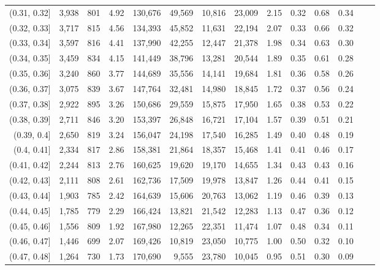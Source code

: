 \begin{tabular}{rrrrrrrrrrrrrr}
(0.31, 0.32]   &  3,938 &  801 &    4.92 &  130,676 &   49,569 &  10,816 &  23,009 &  2.15 &  0.32 &  0.68 &      0.34 \\
(0.32, 0.33]   &  3,717 &  815 &    4.56 &  134,393 &   45,852 &  11,631 &  22,194 &  2.07 &  0.33 &  0.66 &      0.32 \\
(0.33, 0.34]   &  3,597 &  816 &    4.41 &  137,990 &   42,255 &  12,447 &  21,378 &  1.98 &  0.34 &  0.63 &      0.30 \\
(0.34, 0.35]   &  3,459 &  834 &    4.15 &  141,449 &   38,796 &  13,281 &  20,544 &  1.89 &  0.35 &  0.61 &      0.28 \\
(0.35, 0.36]   &  3,240 &  860 &    3.77 &  144,689 &   35,556 &  14,141 &  19,684 &  1.81 &  0.36 &  0.58 &      0.26 \\
(0.36, 0.37]   &  3,075 &  839 &    3.67 &  147,764 &   32,481 &  14,980 &  18,845 &  1.72 &  0.37 &  0.56 &      0.24 \\
(0.37, 0.38]   &  2,922 &  895 &    3.26 &  150,686 &   29,559 &  15,875 &  17,950 &  1.65 &  0.38 &  0.53 &      0.22 \\
(0.38, 0.39]   &  2,711 &  846 &    3.20 &  153,397 &   26,848 &  16,721 &  17,104 &  1.57 &  0.39 &  0.51 &      0.21 \\
(0.39, 0.4]    &  2,650 &  819 &    3.24 &  156,047 &   24,198 &  17,540 &  16,285 &  1.49 &  0.40 &  0.48 &      0.19 \\
(0.4, 0.41]    &  2,334 &  817 &    2.86 &  158,381 &   21,864 &  18,357 &  15,468 &  1.41 &  0.41 &  0.46 &      0.17 \\
(0.41, 0.42]   &  2,244 &  813 &    2.76 &  160,625 &   19,620 &  19,170 &  14,655 &  1.34 &  0.43 &  0.43 &      0.16 \\
(0.42, 0.43]   &  2,111 &  808 &    2.61 &  162,736 &   17,509 &  19,978 &  13,847 &  1.26 &  0.44 &  0.41 &      0.15 \\
(0.43, 0.44]   &  1,903 &  785 &    2.42 &  164,639 &   15,606 &  20,763 &  13,062 &  1.19 &  0.46 &  0.39 &      0.13 \\
(0.44, 0.45]   &  1,785 &  779 &    2.29 &  166,424 &   13,821 &  21,542 &  12,283 &  1.13 &  0.47 &  0.36 &      0.12 \\
(0.45, 0.46]   &  1,556 &  809 &    1.92 &  167,980 &   12,265 &  22,351 &  11,474 &  1.07 &  0.48 &  0.34 &      0.11 \\
(0.46, 0.47]   &  1,446 &  699 &    2.07 &  169,426 &   10,819 &  23,050 &  10,775 &  1.00 &  0.50 &  0.32 &      0.10 \\
(0.47, 0.48]   &  1,264 &  730 &    1.73 &  170,690 &    9,555 &  23,780 &  10,045 &  0.95 &  0.51 &  0.30 &      0.09 \\

\end{tabular}
